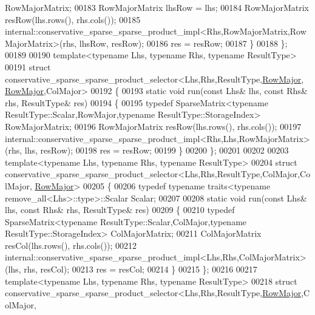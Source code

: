\begin{DoxyCode}
      RowMajorMatrix;
00183     RowMajorMatrix lhsRow = lhs;
00184     RowMajorMatrix resRow(lhs.rows(), rhs.cols());
00185     internal::conservative\_sparse\_sparse\_product\_impl<Rhs,RowMajorMatrix,RowMajorMatrix>(rhs, lhsRow, 
      resRow);
00186     res = resRow;
00187   \}
00188 \};
00189 
00190 \textcolor{keyword}{template}<\textcolor{keyword}{typename} Lhs, \textcolor{keyword}{typename} Rhs, \textcolor{keyword}{typename} ResultType>
00191 \textcolor{keyword}{struct }conservative\_sparse\_sparse\_product\_selector<Lhs,Rhs,ResultType,\hyperlink{group__enums_ggaacded1a18ae58b0f554751f6cdf9eb13acfcde9cd8677c5f7caf6bd603666aae3}{RowMajor},
      \hyperlink{group__enums_ggaacded1a18ae58b0f554751f6cdf9eb13acfcde9cd8677c5f7caf6bd603666aae3}{RowMajor},ColMajor>
00192 \{
00193   \textcolor{keyword}{static} \textcolor{keywordtype}{void} run(\textcolor{keyword}{const} Lhs& lhs, \textcolor{keyword}{const} Rhs& rhs, ResultType& res)
00194   \{
00195     \textcolor{keyword}{typedef} SparseMatrix<typename ResultType::Scalar,RowMajor,typename ResultType::StorageIndex> 
      RowMajorMatrix;
00196     RowMajorMatrix resRow(lhs.rows(), rhs.cols());
00197     internal::conservative\_sparse\_sparse\_product\_impl<Rhs,Lhs,RowMajorMatrix>(rhs, lhs, resRow);
00198     res = resRow;
00199   \}
00200 \};
00201 
00202 
00203 \textcolor{keyword}{template}<\textcolor{keyword}{typename} Lhs, \textcolor{keyword}{typename} Rhs, \textcolor{keyword}{typename} ResultType>
00204 \textcolor{keyword}{struct }conservative\_sparse\_sparse\_product\_selector<Lhs,Rhs,ResultType,ColMajor,ColMajor,
      \hyperlink{group__enums_ggaacded1a18ae58b0f554751f6cdf9eb13acfcde9cd8677c5f7caf6bd603666aae3}{RowMajor}>
00205 \{
00206   \textcolor{keyword}{typedef} \textcolor{keyword}{typename} traits<typename remove\_all<Lhs>::type>::Scalar Scalar;
00207 
00208   \textcolor{keyword}{static} \textcolor{keywordtype}{void} run(\textcolor{keyword}{const} Lhs& lhs, \textcolor{keyword}{const} Rhs& rhs, ResultType& res)
00209   \{
00210     \textcolor{keyword}{typedef} SparseMatrix<typename ResultType::Scalar,ColMajor,typename ResultType::StorageIndex> 
      ColMajorMatrix;
00211     ColMajorMatrix resCol(lhs.rows(), rhs.cols());
00212     internal::conservative\_sparse\_sparse\_product\_impl<Lhs,Rhs,ColMajorMatrix>(lhs, rhs, resCol);
00213     res = resCol;
00214   \}
00215 \};
00216 
00217 \textcolor{keyword}{template}<\textcolor{keyword}{typename} Lhs, \textcolor{keyword}{typename} Rhs, \textcolor{keyword}{typename} ResultType>
00218 \textcolor{keyword}{struct }conservative\_sparse\_sparse\_product\_selector<Lhs,Rhs,ResultType,\hyperlink{group__enums_ggaacded1a18ae58b0f554751f6cdf9eb13acfcde9cd8677c5f7caf6bd603666aae3}{RowMajor},ColMajor,

\end{DoxyCode}
